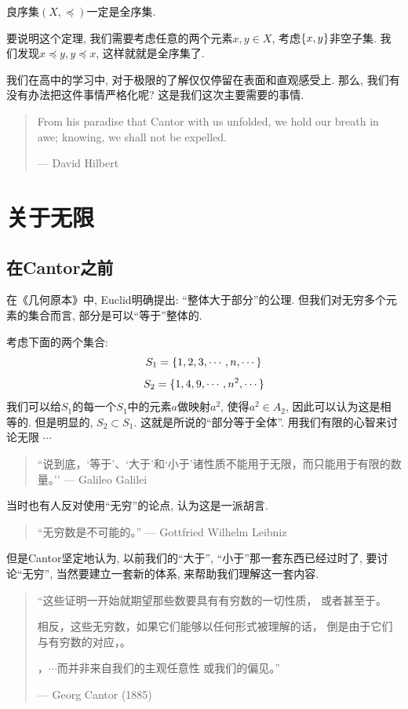 \begin{theorem}
	良序集$(X,\preceq)$一定是全序集. 
\end{theorem}

要说明这个定理, 我们需要考虑任意的两个元素$x,y\in X$, 考虑$\{x,y\}$非空子集. 我们发现$x\preceq y, y\preceq x$, 这样就就是全序集了. 


我们在高中的学习中, 对于极限的了解仅仅停留在表面和直观感受上. 那么, 我们有没有办法把这件事情严格化呢? 这是我们这次主要需要的事情. 

\begin{quote}
    From his paradise that Cantor with us unfolded,
    we hold our breath in awe; knowing, we shall not be expelled.

    \hfill --- David Hilbert
\end{quote}

\section{关于无限}
\subsection{在Cantor之前}
在《几何原本》中, Euclid明确提出: ``整体大于部分''的公理. 但我们对无穷多个元素的集合而言, 部分是可以``等于''整体的. 

考虑下面的两个集合: 
\[
S_1 = \{1, 2, 3, \cdots, n, \cdots\}
\]
\[
S_2 = \{1, 4, 9, \cdots, n^2, \cdots\}
\]
我们可以给$S_1$的每一个$S_1$中的元素$a$做映射$a^2$, 使得$a^2 \in A_2$, 因此可以认为这是相等的. 但是明显的, $S_2 \subset S_1$. 这就是所说的``部分等于全体''. 用我们有限的心智来讨论无限 $\cdots$

\begin{quote}
    ``说到底，`等于'、`大于'和`小于'诸性质不能用于无限，而只能用于有限的数量。'' 
    \hfill --- Galileo Galilei
\end{quote}

当时也有人反对使用``无穷''的论点, 认为这是一派胡言. 
\begin{quote}
    ``无穷数是不可能的。'' \hfill --- Gottfried Wilhelm Leibniz
\end{quote}

但是Cantor坚定地认为, 以前我们的``大于'', ``小于''那一套东西已经过时了, 要讨论``无穷'', 当然要建立一套新的体系, 来帮助我们理解这一套内容. 

\begin{quote}
    ``这些证明一开始就期望那些数要具有有穷数的一切性质，
    或者甚至于。

    相反，这些无穷数，如果它们能够以任何形式被理解的话，
    倒是由于它们与有穷数的对应，。

    ，$\cdots$而并非来自我们的主观任意性
    或我们的偏见。''

    \hfill --- Georg Cantor (1885)
\end{quote}

